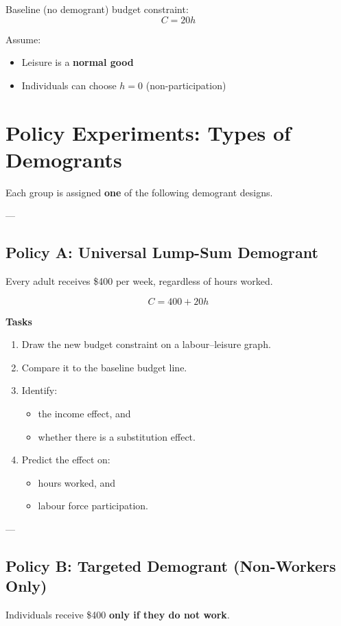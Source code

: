 \documentclass[12pt]{article}
\begin{document}
Baseline (no demogrant) budget constraint:
\[
C = 20h
\]

Assume:
\begin{itemize}
\item Leisure is a \textbf{normal good}
\item Individuals can choose \( h = 0 \) (non-participation)
\end{itemize}

\section*{Policy Experiments: Types of Demogrants}

Each group is assigned \textbf{one} of the following demogrant designs.

---

\subsection*{Policy A: Universal Lump-Sum Demogrant}

Every adult receives \$400 per week, regardless of hours worked.

\[
C = 400 + 20h
\]

\textbf{Tasks}
\begin{enumerate}
\item Draw the new budget constraint on a labour--leisure graph.
\item Compare it to the baseline budget line.
\item Identify:
\begin{itemize}
    \item the income effect, and
    \item whether there is a substitution effect.
\end{itemize}
\item Predict the effect on:
\begin{itemize}
    \item hours worked, and
    \item labour force participation.
\end{itemize}
\end{enumerate}

---

\subsection*{Policy B: Targeted Demogrant (Non-Workers Only)}

Individuals receive \$400 \textbf{only if they do not work}.
\end{document}
